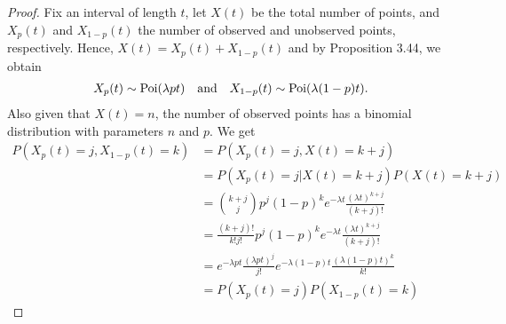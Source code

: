\begin{proof}
  Fix an interval of length $t$, let $X(t)$ be the total number of points, and $X_p(t)$ and $X_{1 - p}(t)$ the number of observed and unobserved points, respectively.
  Hence, $X(t) = X_p(t) + X_{1 - p}(t)$ and by Proposition 3.44, we obtain
  \begin{align*}
    X_p(t) \sim \operatorname{Poi}(\lambda pt) \quad \text{and} \quad X_{1 - p}(t) \sim \operatorname{Poi}(\lambda(1 - p)t).
  \end{align*}
  Also given that $X(t) = n$, the number of observed points has a binomial distribution with parameters $n$ and $p$. We get
  \begin{align*}
    P(X_p(t) = j, X_{1-p}(t) = k) &= P(X_p(t) = j, X(t) = k + j)\\
    &= P(X_p(t) = j | X(t) = k + j)P(X(t) = k + j)\\
    &=\binom{k + j}{j} p^j(1 - p)^ke^{-\lambda t} \frac{(\lambda t)^{k + j}}{(k + j)!}\\
    &= \frac{(k + j)!}{k!j!}p^j(1 - p)^ke^{-\lambda t} \frac{(\lambda t)^{k + j}}{(k + j)!}\\
    &= e^{-\lambda pt} \frac{(\lambda pt)^j}{j!}e^{-\lambda(1 - p)t} \frac{(\lambda(1 - p)t)^k}{k!}\\
    &= P(X_p(t) = j)P(X_{1 - p}(t) = k)
  \end{align*}
\end{proof}

%
